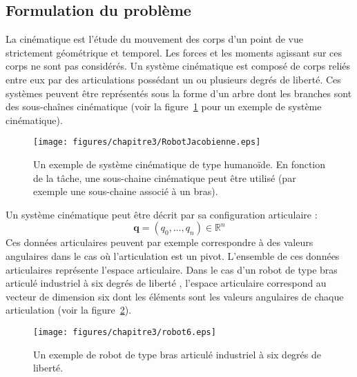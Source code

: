 \subsection{Formulation du problème}
La cinématique est l'étude du mouvement des corps d'un point de vue strictement géométrique
et temporel. Les forces et les moments agissant sur ces corps ne sont pas considérés.
Un système cinématique est composé de corps reliés entre eux par des articulations possédant un
ou plusieurs degrés de liberté. Ces systèmes peuvent être
représentés sous la forme d'un arbre dont les branches
sont des sous-chaînes cinématique (voir la figure~\ref{fig:kinechain} pour un exemple de système cinématique).
\begin{figure}[t]
  \begin{center}
    \texttt{[image: figures/chapitre3/RobotJacobienne.eps]}
  \end{center}
  \caption[Un exemple de système cinématique de type humanoïde.]{Un exemple de système cinématique de type humanoïde. En fonction de la
  t\^ache, une sous-chaine cinématique peut être utilisé (par exemple une sous-chaine associé à un bras).}
  \label{fig:kinechain}
\end{figure}
Un système cinématique peut être décrit par sa configuration articulaire :
\begin{equation}
  \mathbf{q} = (q_0, \ldots, q_n) \in \mathbb{R}^n
  \label{eq:configArt}
\end{equation}
Ces données articulaires peuvent par exemple correspondre à des valeurs
angulaires dans le cas où l'articulation est un pivot.
L'ensemble de ces données articulaires représente l'espace articulaire.
Dans le cas d'un robot de type bras articulé industriel à six degrés de liberté ,
l'espace articulaire correspond au vecteur de dimension six dont les éléments
sont les valeurs angulaires de chaque articulation (voir la figure~\ref{fig:robot6}).
\begin{figure}[t]
  \begin{center}
    \texttt{[image: figures/chapitre3/robot6.eps]}
  \end{center}
  \caption{Un exemple de robot de type bras articulé industriel à six degrés de liberté.}
  \label{fig:robot6}
\end{figure}

